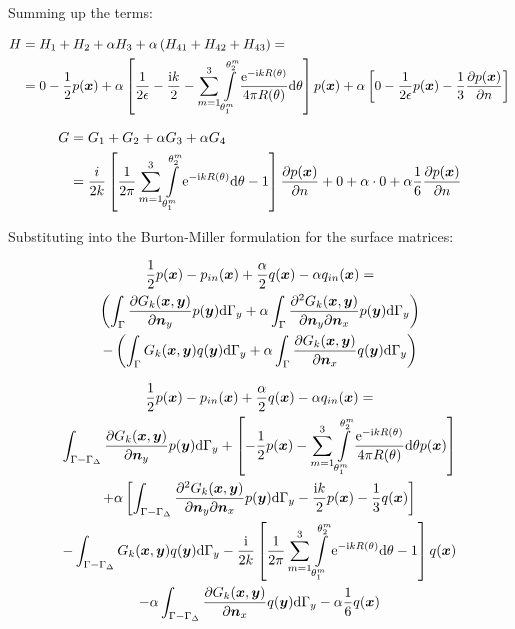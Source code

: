 \documentclass[a4paper, 10pt]{article}
\newcommand{\te}{\mathrm{e}}
\newcommand{\ti}{\mathrm{i}}
\newcommand{\td}{\mathrm{d}}
\newcommand{\sx}{\bm{\mathnormal{x}}}
\newcommand{\sy}{\bm{\mathnormal{y}}}
\newcommand{\sn}{\bm{\mathnormal{n}}}
\newcommand{\summ}{\sum\limits_{m=1}^3}
\newcommand{\intms}{\int\limits_{\theta_1^m}^{\theta_2^m}}
\begin{document}
Summing up the terms:

\begin{align}
	H & = H_1 + H_2 + \alpha H_3 + \alpha \left(H_{41} + H_{42} + H_{43}\right) = \nonumber \\ 
	&= 0 - \frac{1}{2} p(\sx) + \alpha \left[\frac{1}{2\epsilon} - \frac{\ti k}{2}- \summ \intms \frac{\te ^{-\ti k R(\theta)}}{4 \pi R(\theta)} \mathrm{d} \theta\right] p(\sx) + \alpha \left[0 - \frac{1}{2\epsilon} p(\sx) - \frac{1}{3} \frac{\partial{p(\sx)}}{\partial n}\right]
\end{align}

\begin{align}
	G & = G_1 + G_2 + \alpha G_3 + \alpha G_4 \nonumber \\
	& = \frac{i}{2k}\left[\frac{1}{2\pi}\summ \intms \te ^{-\ti kR(\theta)} \mathrm{d} \theta -1 \right]\frac{\partial p(\sx)}{\partial n} + 0 + \alpha \cdot 0 + \alpha \frac{1}{6} \frac{\partial p(\sx)}{\partial n}
\end{align}

Substituting into the Burton-Miller formulation for the surface matrices:

\begin{multline}
	\frac{1}{2} p (\sx)
	-
	p_{in}(\sx)
	+
	\frac{\alpha}{2} q(\sx)
	-
	\alpha q_{in}(\sx)
	= \\
	\left(
	\int_{\Gamma} \frac{\partial{G}_k (\sx, \sy)}{\partial \sn_y} p(\sy) \td \Gamma_y
	+
	\alpha \int_{\Gamma}
	\frac{\partial^2{G}_k (\sx, \sy)}{\partial \sn_y \partial \sn_x} p(\sy) \td \Gamma_y
	\right)
	\\
	-
	\left(
	\int_{\Gamma} G_k(\sx,\sy) q(\sy) \td \Gamma_y
	+
	\alpha \int_{\Gamma}
	\frac{\partial G_k(\sx,\sy)}{\partial \sn_x}q(\sy) \td \Gamma_y
	\right)
\end{multline}

\begin{multline}
	\frac{1}{2} p (\sx)
	-
	p_{in}(\sx)
	+
	\frac{\alpha}{2} q(\sx)
	-
	\alpha q_{in}(\sx)
	= \\
	\int_{\Gamma-\Gamma_\Delta} \frac{\partial{G}_k (\sx, \sy)}{\partial \sn_y} p(\sy) \td \Gamma_y
	+
	\left[-\frac{1}{2}p(\sx) - \summ \intms \frac{\te ^{-\ti k R(\theta)}}{4 \pi R(\theta)} \mathrm{d} \theta p(\sx)\right] 
	\\ + 
	\alpha \left[\int_{\Gamma-\Gamma_\Delta}
	\frac{\partial^2{G}_k (\sx, \sy)}{\partial \sn_y \partial \sn_x} p(\sy) \td \Gamma_y
	- \frac{\ti k}{2} p(\sx) - \frac{1}{3}q(\sx)\right]
	\\
	-
	\int_{\Gamma-\Gamma_\Delta} G_k(\sx,\sy) q(\sy) \td \Gamma_y
	-
	\frac{\ti}{2k}\left[\frac{1}{2\pi}\summ \intms \te ^{-\ti kR(\theta)} \mathrm{d} \theta -1 \right] q(\sx)
	\\
	-
	\alpha \int_{\Gamma-\Gamma_\Delta}
	\frac{\partial G_k(\sx,\sy)}{\partial \sn_x}q(\sy) \td \Gamma_y
	- \alpha \frac{1}{6}q(\sx)
\end{multline}
\end{document}

